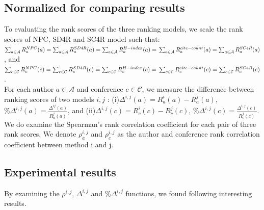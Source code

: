 \documentclass[10pt,leqno,twoside]{article}
\begin{document}
\subsection{Normalized for comparing results}
To evaluating the rank scores of the three ranking models, we scale the rank scores of NPC, SD4R and SC4R model such that:
\\
$\sum_{a \in \mathcal{A}} R^{NPC}_a(a) = 
\sum_{a \in \mathcal{A}} R^{SD4R}_a(a) =
\sum_{a \in \mathcal{A}} R^{H-index}_a(a) =
\\
\sum_{a \in \mathcal{A}} R^{cite-count}_a(a) = 
\sum_{a \in \mathcal{A}} R^{SC4R}_a(a)$,  
and
\\
$\sum_{c \in \mathcal{C}} R^{NPC}_c(c) = 
\sum_{c \in \mathcal{C}} R^{SD4R}_c(c) =
\sum_{c \in \mathcal{C}} R^{H-index}_c(c) =
\\
\sum_{c \in \mathcal{C}} R^{cite-count}_c(c) =
\sum_{c \in \mathcal{C}} R^{SC4R}_c(c) $.
\\ 
For each author $a \in \mathcal{A}$ and conference $c\in \mathcal{C}$, we measure the difference between ranking scores of two models $i,j$ : (i)$\Delta^{i,j}(a)= R^i_a(a) - R^j_a(a)$, $\%\Delta^{i,j} (a)= \frac{\Delta^{ij}(a)}{R^j_a(a)}$, and (ii)$\Delta^{i,j} (c)= R^i_c(c) - R^j_c(c)$, $\%\Delta ^{i,j}(c)= \frac{\Delta^{i,j}(c)}{R^j_c(c)}$. 
\\
We do examine the Spearman's rank correlation coefficient for each pair of three rank scores. We denote $\rho^{i,j}_a$ and $\rho^{i,j}_c$ as the author and conference rank correlation coefficient between method i and j.

\subsection{Experimental results}


By examining the $\rho^{i,j}$, $\Delta^{i,j}$ and  $\%\Delta^{i,j}$ functions, we found following interesting results.
\end{document}
